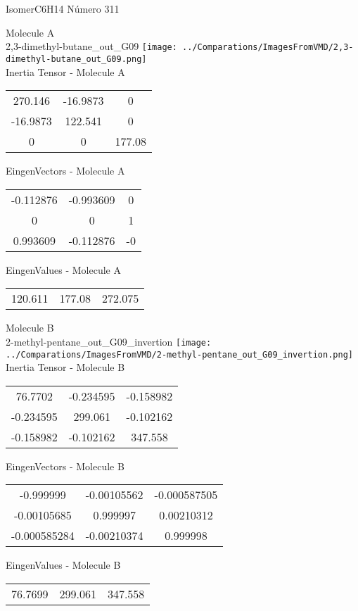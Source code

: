 \vtab[-2cm]
\begin{center}
{\large IsomerC6H14 \tab Número 311}
\end{center}
\begin{multicols}{2}
\begin{center}

Molecule A \\ 
2,3-dimethyl-butane\_out\_G09
\texttt{[image: ../Comparations/ImagesFromVMD/2,3-dimethyl-butane\_out\_G09.png]}
\\
Inertia Tensor - Molecule A \\
\vtab

\begin{tabular}{|c c c|}
270.146	 & 	-16.9873	 & 	0	 \\
-16.9873	 & 	122.541	 & 	0	 \\
0	 & 	0	 & 	177.08
\end{tabular}

\vtab
 EingenVectors - Molecule A     \\
\vtab
\begin{tabular}{|c c c|}
-0.112876	 & 	-0.993609	 & 	0	 \\
0	 & 	0	 & 	1	 \\
0.993609	 & 	-0.112876	 & 	-0
\end{tabular}

\vtab
 EingenValues - Molecule A     \\
\vtab
\begin{tabular}{|c c c|}
120.611	 & 	177.08	 & 	272.075	 \\
\end{tabular}
\columnbreak

Molecule B \\ 
2-methyl-pentane\_out\_G09\_invertion
\texttt{[image: ../Comparations/ImagesFromVMD/2-methyl-pentane\_out\_G09\_invertion.png]}
\\
Inertia Tensor - Molecule B \\
\vtab

\begin{tabular}{|c c c|}
76.7702	 & 	-0.234595	 & 	-0.158982	 \\
-0.234595	 & 	299.061	 & 	-0.102162	 \\
-0.158982	 & 	-0.102162	 & 	347.558
\end{tabular}

\vtab
 EingenVectors - Molecule B     \\
\vtab
\begin{tabular}{|c c c|}
-0.999999	 & 	-0.00105562	 & 	-0.000587505	 \\
-0.00105685	 & 	0.999997	 & 	0.00210312	 \\
-0.000585284	 & 	-0.00210374	 & 	0.999998
\end{tabular}

\vtab
 EingenValues - Molecule B     \\
\vtab
\begin{tabular}{|c c c|}
76.7699	 & 	299.061	 & 	347.558	 \\
\end{tabular}

\end{center}
\end{multicols}
